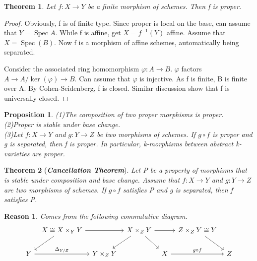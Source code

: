 \documentclass{ctexart}
\newtheorem{theorem}{Theorem}[section]
\newtheorem{proposition}{Proposition}[section]
\newtheorem{reason}{Reason}[section]
\newcommand{\spec}{\operatorname{Spec}}
\begin{document}
\begin{theorem}
    Let $f: X \longrightarrow Y$ be a finite morphism of schemes.
    Then f is proper.
    \label{Theorem 4.1}
\end{theorem}
\begin{proof}
    Obviously, f is of finite type.
    Since proper is local on the base, can assume that $Y = \spec A$.
    While f is affine, get $X = f^{-1}(Y)$ affine.
    Assume that $X = \spec(B)$.
    Now f is a morphism of affine schemes, automatically being separated.
    \par
    Consider the associated ring homomorphism $\varphi: A \longrightarrow B$.
    $\varphi$ factors $A \longrightarrow A/\ker(\varphi) \longrightarrow B$.
    Can assume that $\varphi$ is injective.
    As f is finite, B is finite over A.
    By Cohen-Seidenberg, f is closed.
    Similar discussion show that f is universally closed.
\end{proof}
\begin{proposition}
    (1)The composition of two proper morphisms is proper. \\
    (2)Proper is stable under base change. \\
    (3)Let $f: X \longrightarrow Y$ and $g: Y \longrightarrow Z$ be two morphisms of schemes.
    If $g \circ f$ is proper and g is separated, then f is proper.
    In particular, k-morphisms between abstract k-varieties are proper.
    \label{Proposition 4.8}
\end{proposition}
\begin{theorem}[\textbf{\emph{Cancellation Theorem}}]
    Let P be a property of morphisms that is stable under composition and base change.
    Assume that $f: X \longrightarrow Y$ and $g: Y \longrightarrow Z$ are two morphisms of schemes.
    If $g \circ f$ satisfies P and g is separated, then f satisfies P.
    \label{Theorem 4.2}
\end{theorem}
\begin{reason}
    Comes from the following commutative diagram. 
    \begin{equation*}
        \begin{tikzcd}[column sep = tiny]
            & X \cong X \times_{Y} Y \arrow[rr] \arrow[dl] &&
            X \times_{Z} Y \arrow[rr] \arrow[dr] \arrow[dl] &&
            Z \times_{Z} Y \cong Y \arrow[dr] & \\
            Y \arrow[rr, "\Delta_{Y/Z}"] && 
            Y \times_{Z} Y &&
            X \arrow[rr, "g \circ f"] &&
            Z
        \end{tikzcd}
    \end{equation*}
\end{reason}
\end{document}
